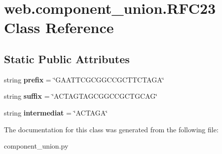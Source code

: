 \hypertarget{classweb_1_1component__union_1_1_r_f_c23}{\section{web.\-component\-\_\-union.\-R\-F\-C23 Class Reference}
\label{classweb_1_1component__union_1_1_r_f_c23}
}
\subsection*{Static Public Attributes}
\begin{DoxyCompactItemize}
\item 
\hypertarget{classweb_1_1component__union_1_1_r_f_c23_abdc88199a66f17449ef9c9997da0e97a}{string {\bfseries prefix} = \char`\"{}G\-A\-A\-T\-T\-C\-G\-C\-G\-G\-C\-C\-G\-C\-T\-T\-C\-T\-A\-G\-A\char`\"{}}\label{classweb_1_1component__union_1_1_r_f_c23_abdc88199a66f17449ef9c9997da0e97a}

\item 
\hypertarget{classweb_1_1component__union_1_1_r_f_c23_ac0b9a3c7700f70059eaca989afb4b392}{string {\bfseries suffix} = \char`\"{}A\-C\-T\-A\-G\-T\-A\-G\-C\-G\-G\-C\-C\-G\-C\-T\-G\-C\-A\-G\char`\"{}}\label{classweb_1_1component__union_1_1_r_f_c23_ac0b9a3c7700f70059eaca989afb4b392}

\item 
\hypertarget{classweb_1_1component__union_1_1_r_f_c23_abc3b7672763428384e052ccbfc264389}{string {\bfseries intermediat} = \char`\"{}A\-C\-T\-A\-G\-A\char`\"{}}\label{classweb_1_1component__union_1_1_r_f_c23_abc3b7672763428384e052ccbfc264389}

\end{DoxyCompactItemize}


The documentation for this class was generated from the following file\-:\begin{DoxyCompactItemize}
\item 
component\-\_\-union.\-py\end{DoxyCompactItemize}
